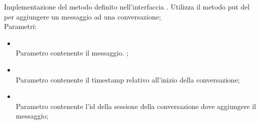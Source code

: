 \begin{itemize}
\begin{itemize}
		Implementazione del metodo definito nell'interfaccia . Utilizza il metodo put del  per aggiungere un messaggio ad una conversazione;\\
		Parametri:
		\begin{itemize}
			\item {} \\
			Parametro contenente il messaggio.
;
			\item {} \\
			Parametro contenente il timestamp relativo all'inizio della conversazione;
			\item {} \\
			Parametro contenente l'id della sessione della conversazione dove aggiungere il messaggio;
		\end{itemize}
	\end{itemize}
\end{itemize}
\FloatBarrier

